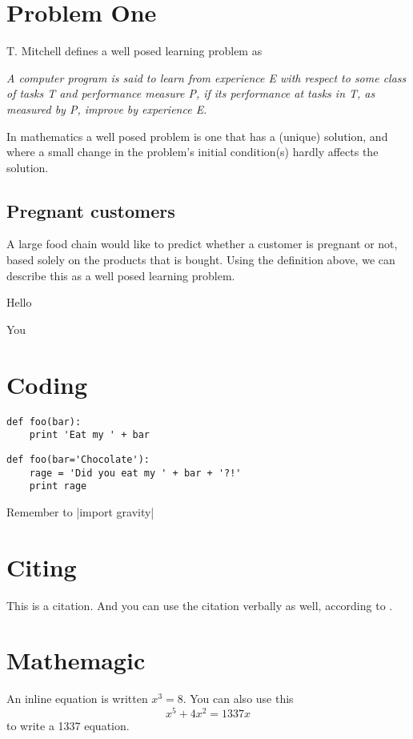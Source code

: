 \documentclass[00-00-main.tex]{subfiles}
\begin{document}
\section{Problem One}
T. Mitchell defines a well posed learning problem as
\begin{listing}
\textit{A computer program is said to learn from experience E with respect to some
class of tasks T and performance measure P, if its performance at tasks in T,
as measured by P, improve by experience E.}
\end{listing}
In mathematics a well posed problem is one that has a (unique) solution, and where a
small change in the problem's initial condition(s) hardly affects the solution.

\subsection{Pregnant customers}
A large food chain would like to predict whether a customer is pregnant or not, based
solely on the products that is bought. Using the definition above, we can describe this
as a well posed learning problem.

\item Hello
\item You



\section{Coding}

\begin{lstlisting}
def foo(bar):
    print 'Eat my ' + bar
\end{lstlisting}

\begin{listing}
\begin{verbatim} 
def foo(bar='Chocolate'):
    rage = 'Did you eat my ' + bar + '?!'
    print rage
\end{verbatim}
\end{listing}
Remember to  |import gravity|

\section{Citing}
This is a citation\cite{kiss-2010-I}. And you can use the citation verbally as well, according to \citet{kiss-2010-I}.

\section{Mathemagic}
An inline equation is written $x^3 = 8$. You can also use this
\begin{equation}
\label{eq:1337-equation}
x^5+4x^2=1337x
\end{equation}
to write a 1337 equation.
\bibliosub
\end{document}
